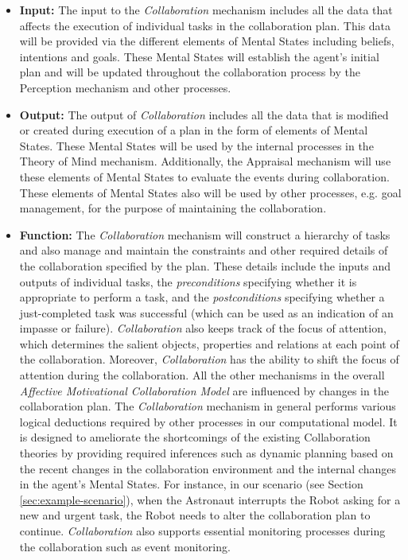\documentclass[12pt]{report}
\begin{document}
\begin{itemize}
  \item \textbf{Input:} The input to the \textit{Collaboration} mechanism
  includes all the data that affects the execution of individual tasks in the
  collaboration plan. This data will be provided via the different elements of
  Mental States including beliefs, intentions and goals. These Mental States
  will establish the agent's initial plan and will be updated throughout the
  collaboration process by the Perception mechanism and other processes.
  
  \item \textbf{Output:} The output of \textit{Collaboration} includes all the
  data that is modified or created during execution of a plan in the form of
  elements of Mental States. These Mental States will be used by the internal
  processes in the Theory of Mind mechanism. Additionally, the Appraisal
  mechanism will use these elements of Mental States to evaluate the events
  during collaboration. These elements of Mental States also will be used by
  other processes, e.g. goal management, for the purpose of maintaining the
  collaboration.
  
  \item \textbf{Function:} The \textit{Collaboration} mechanism will construct a
  hierarchy of tasks and also manage and maintain the constraints and other
  required details of the collaboration specified by the plan. These details
  include the inputs and outputs of individual tasks, the \textit{preconditions}
  specifying whether it is appropriate to perform a task, and the
  \textit{postconditions} specifying whether a just-completed task was
  successful (which can be used as an indication of an impasse or failure).
  \textit{Collaboration} also keeps track of the focus of attention, which
  determines the salient objects, properties and relations at each point of the
  collaboration. Moreover, \textit{Collaboration} has the ability to shift the
  focus of attention during the collaboration. All the other mechanisms in the
  overall \textit{Affective Motivational Collaboration Model} are influenced by
  changes in the collaboration plan.
  The \textit{Collaboration} mechanism in general performs various logical
  deductions required by other processes in our computational model. It is
  designed to ameliorate the shortcomings of the existing Collaboration theories
  by providing required inferences such as dynamic planning based on the recent
  changes in the collaboration environment and the internal changes in the
  agent's Mental States. For instance, in our scenario (see Section
  \ref{sec:example-scenario}), when the Astronaut interrupts the Robot asking
  for a new and urgent task, the Robot needs to alter the collaboration plan to
  continue. \textit{Collaboration} also supports essential monitoring processes
  during the collaboration such as event monitoring.
\end{itemize}
\end{document}
